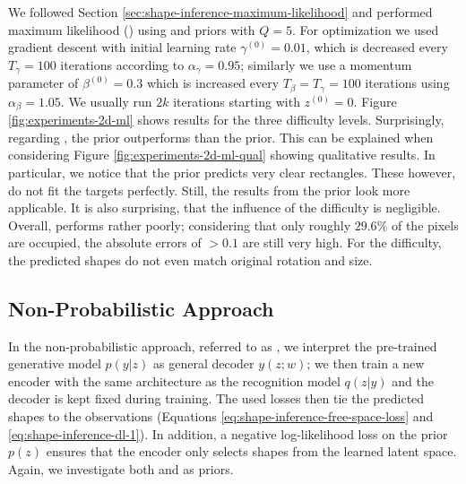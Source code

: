 


We followed Section \ref{sec:shape-inference-maximum-likelihood} and performed
maximum likelihood (\ML) using \PPCA and \VAE priors with $Q = 5$. 
For optimization we used gradient descent with initial learning rate $\gamma^{(0)} = 0.01$,
which is decreased every $T_{\gamma} = 100$ iterations according to $\alpha_{\gamma} = 0.95$;
similarly we use a momentum parameter of $\beta^{(0)} = 0.3$ which is increased
every $T_{\beta} = T_{\gamma} = 100$ iterations using $\alpha_{\beta} = 1.05$. We usually
run $2k$ iterations starting with $z^{(0)} = 0$.
Figure \ref{fig:experiments-2d-ml} shows results for the
three difficulty levels. Surprisingly, regarding \AbsThr, the \PPCA prior
outperforms than the \VAE prior. This can be explained
when considering Figure \ref{fig:experiments-2d-ml-qual} showing qualitative
results. In particular, we notice that the \VAE prior predicts very clear
rectangles. These however, do not fit the targets perfectly. Still, 
the results from the \VAE prior look more applicable.
It is also surprising, that the influence of the difficulty is negligible.
Overall, \ML performs rather poorly; considering that only roughly $29.6\%$
of the pixels are occupied, the absolute errors of $>0.1$ are still very high.
For the \hard difficulty, the predicted shapes do not even match original rotation
and size.

\subsection{Non-Probabilistic Approach}



In the non-probabilistic approach,
referred to as \DL, we interpret the pre-trained generative model $p(y|z)$
as general decoder $y(z;w)$; we then train a new encoder with the same architecture
as the recognition model $q(z|y)$ and the decoder is kept
fixed during training. The used losses
then tie the predicted shapes to the observations
(\cf Equations \eqref{eq:shape-inference-free-space-loss} and \eqref{eq:shape-inference-dl-1}).
In addition, a negative log-likelihood
loss on the prior $p(z)$ ensures that the encoder only selects shapes from
the learned latent space. Again, we investigate both \PPCA and \VAEs as priors.

